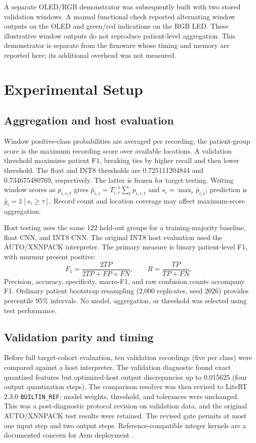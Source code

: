 \documentclass[9pt,twocolumn,twoside,lineno]{MSBJournal}
\begin{document}
A separate OLED/RGB demonstrator was subsequently built with two stored validation windows. A manual functional check reported alternating window outputs on the OLED and green/red indications on the RGB LED. These illustrative window outputs do not reproduce patient-level aggregation. This demonstrator is separate from the firmware whose timing and memory are reported here; its additional overhead was not measured.


\section{Experimental Setup}
\subsection{Aggregation and host evaluation}
Window positive-class probabilities are averaged per recording; the patient-group score is the maximum recording score over available locations. A validation threshold maximizes patient F1, breaking ties by higher recall and then lower threshold. The float and INT8 thresholds are 0.725111204844 and 0.734675480769, respectively. The latter is frozen for target testing. Writing window scores as $p_{i,r,t}$ gives $\bar p_{i,r}=T_{i,r}^{-1}\sum_t p_{i,r,t}$ and $s_i=\max_r\bar p_{i,r}$; prediction is $\hat y_i=\mathbb{1}[s_i\ge\tau]$. Record count and location coverage may affect maximum-score aggregation.

Host testing uses the same 122 held-out groups for a training-majority baseline, float CNN, and INT8 CNN. The original INT8 host evaluation used the AUTO/XNNPACK interpreter. The primary measure is binary patient-level F1, with murmur present positive:
\begin{equation}
F_1=\frac{2TP}{2TP+FP+FN},\qquad R=\frac{TP}{TP+FN}.
\end{equation}
Precision, accuracy, specificity, macro-F1, and raw confusion counts accompany F1. Ordinary patient bootstrap resampling (2,000 replicates, seed 2026) provides percentile 95\% intervals. No model, aggregation, or threshold was selected using test performance.

\subsection{Validation parity and timing}
Before full target-cohort evaluation, ten validation recordings (five per class) were compared against a host interpreter. The validation diagnostic found exact quantized features but optimized-host output discrepancies up to 0.015625 (four output quantization steps). The comparison resolver was then revised to LiteRT 2.3.0 \texttt{BUILTIN\_REF}; model weights, threshold, and tolerances were unchanged. This was a post-diagnostic protocol revision on validation data, and the original AUTO/XNNPACK test results were retained. The revised gate permits at most one input step and two output steps. Reference-compatible integer kernels are a documented concern for Arm deployment \citep{cmsisnn}.
\end{document}
